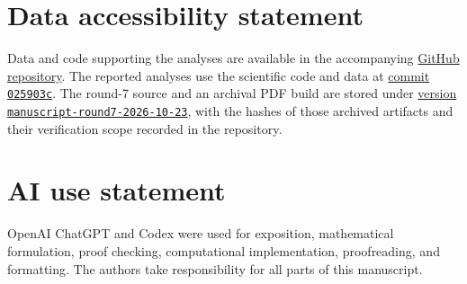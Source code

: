 \documentclass[12pt]{article}
\theoremstyle{definition}
\theoremstyle{remark}
\begin{document}
\section*{Data accessibility statement}
Data and code supporting the analyses are available in the accompanying \href{https://github.com/hiendn/Anytime_Valid_Survival_Tests}{GitHub repository}. The reported analyses use the scientific code and data at \href{https://github.com/hiendn/Anytime_Valid_Survival_Tests/tree/025903c484a004cd278c86738f0721d05104c790}{commit \texttt{025903c}}. The round-7 source and an archival PDF build are stored under \href{https://github.com/hiendn/Anytime_Valid_Survival_Tests/tree/manuscript-round7-2026-10-23}{version \texttt{manuscript-round7-2026-10-23}}, with the hashes of those archived artifacts and their verification scope recorded in the repository.

\section*{AI use statement}
OpenAI ChatGPT and Codex were used for exposition, mathematical formulation, proof checking, computational implementation, proofreading, and formatting. The authors take responsibility for all parts of this manuscript.
\end{document}
